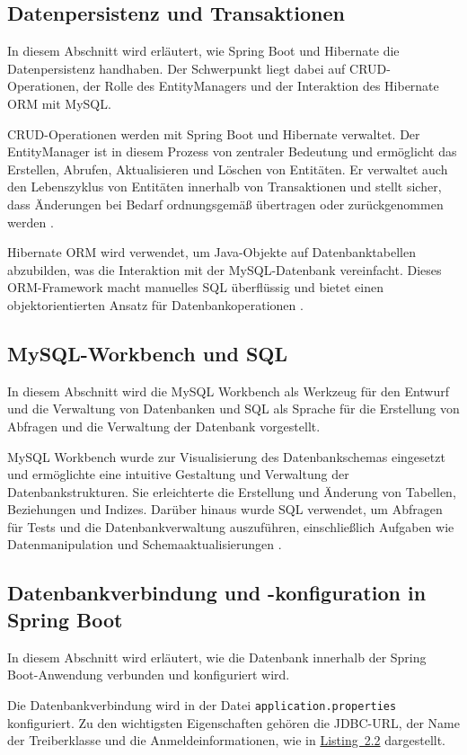 \subsection{Datenpersistenz und Transaktionen}
In diesem Abschnitt wird erläutert, wie Spring Boot und Hibernate die Datenpersistenz handhaben. Der Schwerpunkt liegt dabei auf CRUD-Operationen, der Rolle des EntityManagers und der Interaktion des Hibernate ORM mit MySQL.

CRUD-Operationen werden mit Spring Boot und Hibernate verwaltet. Der EntityManager ist in diesem Prozess von zentraler Bedeutung und ermöglicht das Erstellen, Abrufen, Aktualisieren und Löschen von Entitäten. Er verwaltet auch den Lebenszyklus von Entitäten innerhalb von Transaktionen und stellt sicher, dass Änderungen bei Bedarf ordnungsgemäß übertragen oder zurückgenommen werden  \cite{Baeldung-EntityManager:2024}.


Hibernate ORM wird verwendet, um Java-Objekte auf Datenbanktabellen abzubilden, was die Interaktion mit der MySQL-Datenbank vereinfacht. Dieses ORM-Framework macht manuelles SQL überflüssig und bietet einen objektorientierten Ansatz für Datenbankoperationen \cite{Hibernate:o.J}.


\subsection{MySQL-Workbench und SQL}
In diesem Abschnitt wird die MySQL Workbench als Werkzeug für den Entwurf und die Verwaltung von Datenbanken und SQL als Sprache für die Erstellung von Abfragen und die Verwaltung der Datenbank vorgestellt.

MySQL Workbench wurde zur Visualisierung des Datenbankschemas eingesetzt und ermöglichte eine intuitive Gestaltung und Verwaltung der Datenbankstrukturen. Sie erleichterte die Erstellung und Änderung von Tabellen, Beziehungen und Indizes. Darüber hinaus wurde SQL verwendet, um Abfragen für Tests und die Datenbankverwaltung auszuführen, einschließlich Aufgaben wie Datenmanipulation und Schemaaktualisierungen \cite{mySQL:o.J}.

\subsection{Datenbankverbindung und -konfiguration in Spring Boot}
In diesem Abschnitt wird erläutert, wie die Datenbank innerhalb der Spring Boot-Anwendung verbunden und konfiguriert wird.

Die Datenbankverbindung wird in der Datei \texttt{application.properties} konfiguriert. Zu den wichtigsten Eigenschaften gehören die JDBC-URL, der Name der Treiberklasse und die Anmeldeinformationen, wie in \hyperref[Application.properties]{Listing~2.2} dargestellt.


